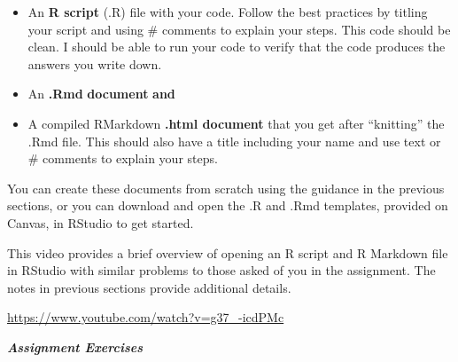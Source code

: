 \documentclass[
  letterpaper,
  DIV=11,
  numbers=noendperiod]{scrreprt}
\providecommand{\tightlist}{%
  \setlength{\itemsep}{0pt}\setlength{\parskip}{0pt}}\usepackage{longtable,booktabs,array}
\begin{document}
\begin{itemize}
\tightlist
\item
  An \textbf{R script} (.R) file with your code. Follow the best
  practices by titling your script and using \# comments to explain your
  steps. This code should be clean. I should be able to run your code to
  verify that the code produces the answers you write down.
\item
  An \textbf{.Rmd} \textbf{document} \textbf{and}
\item
  A compiled RMarkdown \textbf{.html document} that you get after
  ``knitting'' the .Rmd file. This should also have a title including
  your name and use text or \# comments to explain your steps.
\end{itemize}

You can create these documents from scratch using the guidance in the
previous sections, or you can download and open the .R and .Rmd
templates, provided on Canvas, in RStudio to get started.

This video provides a brief overview of opening an R script and R
Markdown file in RStudio with similar problems to those asked of you in
the assignment. The notes in previous sections provide additional
details.

\url{https://www.youtube.com/watch?v=g37_-icdPMc}

\textbf{\emph{Assignment Exercises}}
\end{document}
